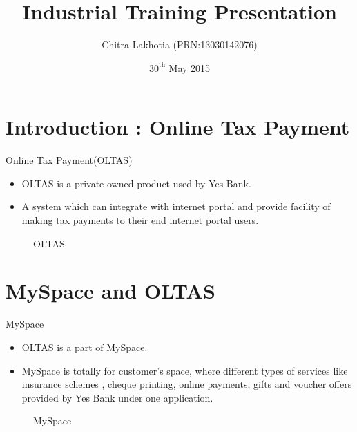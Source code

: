 \documentclass[spanish]{beamer}
\title[Industrial Training:OLTAS]{Industrial Training Presentation}
\author{Chitra Lakhotia (PRN:13030142076)\\}
\institute{\bf Symbiosis Institute of Computer Studies And Research}
\date{$30^{\text{th}}$ May 2015}
\begin{document}
\begin{frame}
  \titlepage
\end{frame}


\section{Introduction : Online Tax Payment}

\begin{frame}{Online Tax Payment(OLTAS)}

\begin{itemize}
  \item OLTAS is a private owned product used by Yes Bank.
  \item A system which can integrate with internet portal and provide facility of making tax payments to their end internet portal users.
\end{itemize}

\begin{figure}
\caption{\label{fig:your-figure}OLTAS}
\end{figure}
\vskip 1cm

\end{frame}

\section{MySpace and OLTAS}

\begin{frame}{MySpace}

\begin{itemize}
  \item OLTAS is a part of MySpace.
  \item MySpace is totally for customer’s space, where different types of services like insurance schemes , cheque printing, online payments, gifts and voucher offers provided by Yes Bank under one application.

\end{itemize}

\begin{figure}
\caption{\label{fig:your-figure}MySpace}
\end{figure}
\vskip 1cm

\end{frame}
\end{document}
